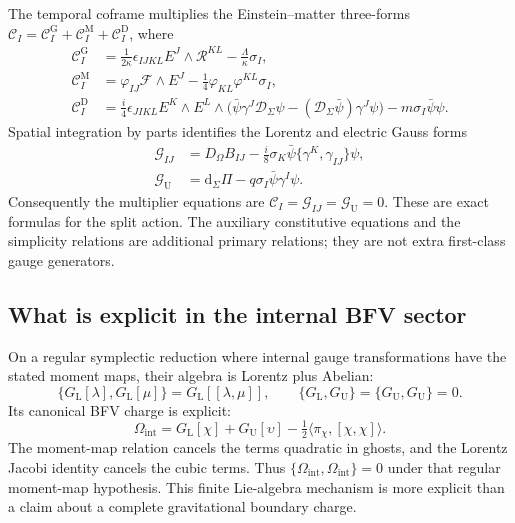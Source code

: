 The temporal coframe multiplies the Einstein--matter three-forms
$\mathcal C_I=\mathcal C_I^{\mathrm G}+\mathcal C_I^{\mathrm M}+\mathcal C_I^{\mathrm D}$, where
\begin{align}
 \mathcal C_I^{\mathrm G}
 &=\tfrac1{2\kappa}\epsilon_{IJKL}E^J\wedge\mathcal R^{KL}
                  -\tfrac\Lambda\kappa\sigma_I,\\
 \mathcal C_I^{\mathrm M}
 &=\varphi_{IJ}\mathcal F\wedge E^J-\tfrac14\varphi_{KL}\varphi^{KL}\sigma_I,\\
 \mathcal C_I^{\mathrm D}
 &=\tfrac i4\epsilon_{JIKL}E^K\wedge E^L\wedge
       \bigl(\bar\psi\gamma^J\mathcal D_\Sigma\psi
                  -(\mathcal D_\Sigma\bar\psi)\gamma^J\psi\bigr)
                      -m\sigma_I\bar\psi\psi.
\end{align}
Spatial integration by parts identifies the Lorentz and electric Gauss forms
\begin{align}
 \mathcal G_{IJ}
 &=D_\Omega B_{IJ}
       -\tfrac i8\sigma_K\bar\psi\{\gamma^K,\gamma_{IJ}\}\psi,\\
 \mathcal G_{\mathrm U}
 &=\mathrm d_\Sigma\Pi-q\sigma_I\bar\psi\gamma^I\psi.
\end{align}
Consequently the multiplier equations are
$\mathcal C_I=\mathcal G_{IJ}=\mathcal G_{\mathrm U}=0$.
These are exact formulas for the split action. The auxiliary constitutive equations and the simplicity relations are additional primary relations; they are not extra first-class gauge generators.

\subsection{What is explicit in the internal BFV sector}
On a regular symplectic reduction where internal gauge transformations have the stated moment maps, their algebra is Lorentz plus Abelian:
\begin{equation}
 \{G_{\mathrm L}[\lambda],G_{\mathrm L}[\mu]\}
       =G_{\mathrm L}[[\lambda,\mu]],\qquad
 \{G_{\mathrm L},G_{\mathrm U}\}=\{G_{\mathrm U},G_{\mathrm U}\}=0.
\end{equation}
Its canonical BFV charge is explicit:
\begin{equation}
 \Omega_{\mathrm{int}}=G_{\mathrm L}[\chi]+G_{\mathrm U}[\upsilon]
                   -\tfrac12\langle\pi_\chi,[\chi,\chi]\rangle.
\end{equation}
The moment-map relation cancels the terms quadratic in ghosts, and the Lorentz Jacobi identity cancels the cubic terms. Thus
$\{\Omega_{\mathrm{int}},\Omega_{\mathrm{int}}\}=0$ under that regular moment-map hypothesis. This finite Lie-algebra mechanism is more explicit than a claim about a complete gravitational boundary charge.

